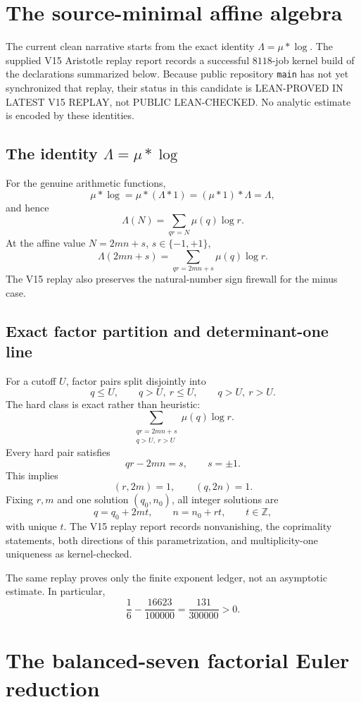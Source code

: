 \documentclass[11pt]{article}
\theoremstyle{definition}
\newcommand{\1}{\mathbf 1}
\newcommand{\status}[1]{\textsf{#1}}
\begin{document}
{{{\section{The source-minimal affine algebra}

The current clean narrative starts from the exact identity $\Lambda=\mu*\log$.  The supplied
V15 Aristotle replay report records a successful $8118$-job kernel build of the declarations
summarized below.  Because public repository \texttt{main} has not yet synchronized that replay,
their status in this candidate is \status{LEAN-PROVED IN LATEST V15 REPLAY}, not
\status{PUBLIC LEAN-CHECKED}.  No analytic estimate is encoded by these identities.

\subsection{The identity $\Lambda=\mu*\log$}

For the genuine arithmetic functions,
\[
\mu*\log=\mu*(\Lambda*1)=(\mu*1)*\Lambda=\Lambda,
\]
and hence
\[
\boxed{\Lambda(N)=\sum_{qr=N}\mu(q)\log r.}
\]
At the affine value $N=2mn+s$, $s\in\{-1,+1\}$,
\[
\boxed{\Lambda(2mn+s)=\sum_{qr=2mn+s}\mu(q)\log r.}
\]
The V15 replay also preserves the natural-number sign firewall for the minus case.

\subsection{Exact factor partition and determinant-one line}

For a cutoff $U$, factor pairs split disjointly into
\[
q\le U,\qquad q>U,\ r\le U,\qquad q>U,\ r>U.
\]
The hard class is exact rather than heuristic:
\[
\sum_{\substack{qr=2mn+s\\q>U,\ r>U}}\mu(q)\log r.
\]
Every hard pair satisfies
\[
qr-2mn=s,\qquad s=\pm1.
\]
This implies
\[
(r,2m)=1,\qquad(q,2n)=1.
\]
Fixing $r,m$ and one solution $(q_0,n_0)$, all integer solutions are
\[
\boxed{q=q_0+2mt,\qquad n=n_0+rt,\qquad t\in\mathbb Z,}
\]
with unique $t$.  The V15 replay report records nonvanishing, the coprimality statements,
both directions of this parametrization, and multiplicity-one uniqueness as kernel-checked.

The same replay proves only the finite exponent ledger, not an asymptotic estimate.  In
particular,
\[
\frac16-\frac{16623}{100000}=\frac{131}{300000}>0.
\]

\section{The balanced-seven factorial Euler reduction}

}}}
\end{document}
